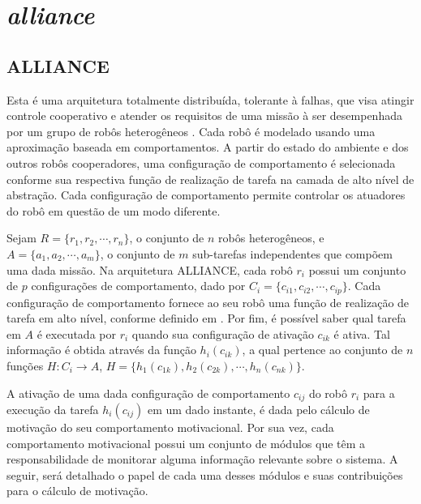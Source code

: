             
        
        
        
        
        
        
        
        
        
        
        
        
        
        
        
    \section{\textit{alliance}} \label{sec:alliance}
        
        \subsection{ALLIANCE} \label{subsec:alliance}
            Esta é uma arquitetura totalmente distribuída, tolerante à falhas, que visa atingir controle cooperativo e atender os requisitos de uma missão à ser desempenhada por um grupo de robôs heterogêneos \cite{ref:parker1998alliance}. Cada robô é modelado usando uma aproximação baseada em comportamentos. A partir do estado do ambiente e dos outros robôs cooperadores, uma configuração de comportamento é selecionada conforme sua respectiva função de realização de tarefa na camada de alto nível de abstração. Cada configuração de comportamento permite controlar os atuadores do robô em questão de um modo diferente.
            
            Sejam $R=\{r_1, r_2, \cdots, r_n\}$, o conjunto de $n$ robôs heterogêneos, e $A=\{a_1,a_2, \cdots,\allowbreak a_m\}$, o conjunto de $m$ sub-tarefas independentes que compõem uma dada missão. Na arquitetura ALLIANCE, cada robô $r_i$ possui um conjunto de $p$ configurações de comportamento, dado por $C_i=\{c_{i1}, c_{i2},\cdots, c_{ip}\}$. Cada configuração de comportamento fornece ao seu robô uma função de realização de tarefa em alto nível, conforme definido em \cite{ref:brooks1986robust}. Por fim, é possível saber qual tarefa em $A$ é executada por $r_i$ quando sua configuração de ativação $c_{ik}$ é ativa. Tal informação é obtida através da função $h_i(c_{ik})$, a qual pertence ao conjunto de $n$ funções $H : C_i \to A$, $H = \{h_1(c_{1k}),\allowbreak h_2(c_{2k}), \cdots, h_n(c_{nk})\}$.
            
            A ativação de uma dada configuração de comportamento $c_{ij}$ do robô $r_i$ para a execução da tarefa $h_i(c_{ij})$ em um dado instante, é dada pelo cálculo de motivação do seu comportamento motivacional. Por sua vez, cada comportamento motivacional possui um conjunto de módulos que têm a responsabilidade de monitorar alguma informação relevante sobre o sistema. A seguir, será detalhado o papel de cada uma desses módulos e suas contribuições para o cálculo de motivação.
            
